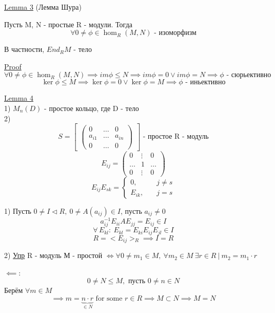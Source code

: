 \documentclass[a4paper]{article}
\begin{document}
\begin{tcolorbox}
\underline{Lemma 3} (Лемма Шура)

Пусть M, N - простые R - модули. Тогда
\[
    \forall 0 \neq \phi \in \hom_R(M,N) \text{ - изоморфизм}
\]

В частности, $ End_R M $ - тело

\underline{Proof} 
\[
    \forall 0 \neq \phi \in \hom_R(M,N) \implies im \phi \leq N \implies
    im \phi = 0 \lor im \phi = N \implies \phi \text{ - сюрьективно}
\]
\[
    \ker \phi \leq M \implies \ker \phi = 0 \lor \ker \phi = M \implies
    \phi \text{ - иньективно}
\]
\end{tcolorbox}

\begin{tcolorbox}
\underline{Lemma 4}\\
1) $ M_n(D) $ - простое кольцо, где D - тело\\
2) \[
    S = \begin{bmatrix}
         \begin{pmatrix}
            0 & \dots & 0\\
            a_{i 1} & \dots & a_{in}\\
            0 & \dots & 0
        \end{pmatrix}
    \end{bmatrix} 
    \text{ - простое R - модуль}
\]
\[
    E_{ij} =
    \begin{pmatrix}
        0 &\vdots &0\\
        \dots & 1 & \dots\\
        0 &\vdots & 0
    \end{pmatrix}
\]
\[
    E_{ij}E_{sk} = 
    \begin{cases}
        0, &\quad j \neq s\\
        E_{ik}, &\quad j = s
    \end{cases}
\]

1) Пусть $ 0 \neq I \lhd R, \ 0 \neq A (a_{ij}) \in I $, пусть $ a_{ij} \neq 0 $  
\[
    a_{ij}^{-1} E_{ii} A E_{jj} = E_{ij} \in I
\]
\[
    \forall \, E_{kl}: \ E_{kl} = E_{ki}E_{ij}E_{jl} \in I
\]
\[
    R = < E_{ij} >_R \implies I = R
\]

2) \underline{Упр} R -  модуль М - простой $ \iff \forall 0 \neq m_1 \in M, \ 
\forall m_2 \in M \ \exists r \in R \ | \ m_2 = m_1 \cdot r$ 

$ \impliedby $: 
\[
    0 \neq N \leq M, \text{ пусть } 0 \neq n \in N
\]
Берём $ \forall m \in M $ 
\[
    \implies m = \underbrace{n \cdot r}_{\in N} \text{ for some } r \in R
    \implies M \subset N \implies M = N
\]
\end{tcolorbox}
\end{document}
